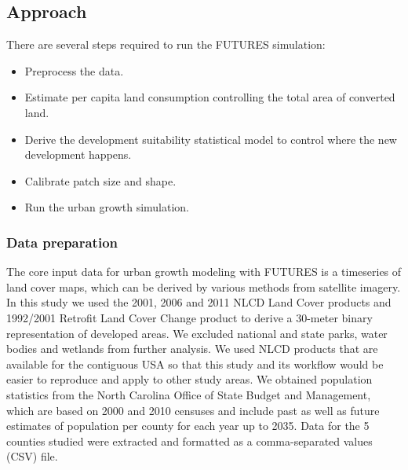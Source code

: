 \documentclass{isprs}
\begin{document}
\subsection{Approach}
There are several steps required to run the FUTURES simulation:
\begin{itemize}[noitemsep,nolistsep]
 \item Preprocess the data.
 \item Estimate per capita land consumption 
controlling the total area of converted land.
 \item Derive the development suitability statistical model to control where the new development happens.
 \item Calibrate patch size and shape.
 \item Run the urban growth simulation.
\end{itemize}

\subsubsection{Data preparation}
The core input data for urban growth modeling with FUTURES is a timeseries of land cover maps,
which can be derived by various methods from satellite imagery. 
In this study
we used the 2001, 2006 and 2011 NLCD Land Cover products 
and 1992/2001 Retro\-fit Land Cover Change product to derive a 30-meter binary representation
of developed areas. We excluded national and state parks,
water bodies and wetlands from further analysis. 
We used NLCD products that are available for the contiguous USA 
so that this study and its workflow would be easier to reproduce and apply to other study areas.
We obtained population statistics from the North Carolina Office of State Budget and Management,
which are based on 2000 and 2010 censuses and include past as well as future estimates
of population per county for each year up to 2035. Data for the 5  counties studied
were extracted and formatted as a comma-separated values (CSV) file.
\end{document}
